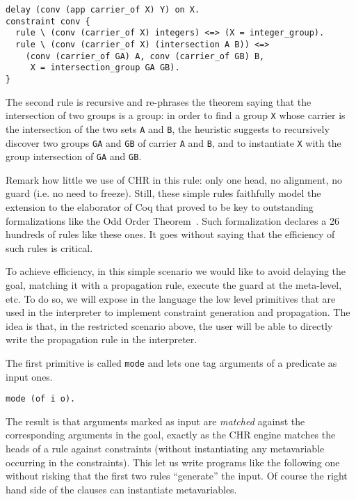 \documentclass{easychair}
\begin{document}
\begin{Verbatim}
delay (conv (app carrier_of X) Y) on X.
constraint conv {
  rule \ (conv (carrier_of X) integers) <=> (X = integer_group).
  rule \ (conv (carrier_of X) (intersection A B)) <=>
    (conv (carrier_of GA) A, conv (carrier_of GB) B,
     X = intersection_group GA GB).
}
\end{Verbatim}

The second rule is recursive and re-phrases the theorem saying
that the intersection of two groups is a group: in order to find a group \verb+X+ whose carrier is the intersection of the two sets \verb+A+ and \verb+B+, the heuristic suggests to recursively discover two groups \verb+GA+ and \verb+GB+ of carrier \verb+A+ and \verb+B+, and to instantiate \verb+X+ with the group intersection of \verb+GA+ and \verb+GB+.

Remark how little we use of CHR in this rule: only one head, no alignment,
no guard (i.e. no need to freeze).
Still, these simple rules faithfully model the extension to the elaborator
of Coq that proved to be key to outstanding formalizations like
the Odd Order Theorem~\cite{oothm}.  Such formalization declares a 26
hundreds of rules like these ones.  It goes without saying that
the efficiency of such rules is critical.

To achieve efficiency, in this simple scenario we would like to avoid delaying the goal, matching it with a propagation rule, execute the guard at the meta-level, etc. To do so, we will expose in the language the low level primitives that are used in the interpreter to implement constraint generation and propagation. The idea is that, in the restricted scenario above, the user will be able to directly write the propagation rule in the interpreter.

The first primitive is called \verb+mode+ and lets one tag arguments of
a predicate as input ones.

\begin{Verbatim}
mode (of i o).
\end{Verbatim}

The result is that arguments marked as input are \emph{matched}
against the corresponding arguments in the goal, exactly as the
CHR engine matches the heads of a rule against constraints (without
instantiating any metavariable occurring in the constraints).
This let us write programs like the following one without risking that
the first two rules ``generate'' the input.  Of course the right
hand side of the clauses can instantiate metavariables.
\end{document}

